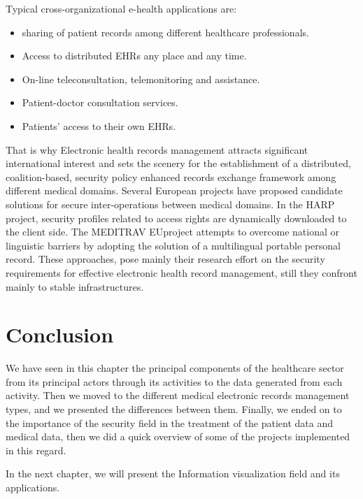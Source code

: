 \bigbreak
Typical cross-organizational e-health applications are\cite{ruotsalainenCrossplatformModelSecure2004}: 
\begin{itemize}
\renewcommand{\labelitemi}{$\bullet$}
\item sharing of patient records among different healthcare professionals. 
\item Access to distributed EHRs any place and any time. 
\item On-line teleconsultation, telemonitoring and assistance. 
\item Patient-doctor consultation services.
\item Patients’ access to their own EHRs.
\end{itemize}


That is why Electronic health records management attracts significant international interest and sets the scenery for the establishment of a distributed, coalition-based, security policy enhanced records exchange framework among different medical domains. Several European projects have proposed candidate solutions for secure inter-operations between medical domains. In the HARP project, security profiles related to access rights are dynamically downloaded to the client side. The MEDITRAV EUproject attempts to overcome national or linguistic barriers by adopting the solution of a multilingual portable personal record. These approaches, pose mainly their research effort on the security requirements for effective electronic health record management, still they confront mainly to stable infrastructures\cite{belsisPervasiveSecureElectronic2005}.
\newpage
\section{Conclusion}
We have seen in this chapter the principal components of the healthcare sector from its principal actors through its activities to the data generated from each activity. Then we moved to the different medical electronic records management types, and we presented the differences between them. Finally, we ended on to the importance of the security field in the treatment of the patient data and medical data, then we did a quick overview of some of the projects implemented in this regard.


In the next chapter, we will present the Information visualization field and its applications.
